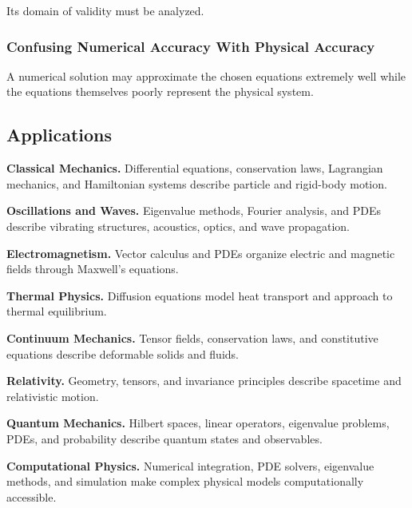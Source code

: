 Its domain of validity must be analyzed.

\subsubsection{Confusing Numerical Accuracy With Physical Accuracy}

A numerical solution may approximate the chosen equations extremely well
while the equations themselves poorly represent the physical system.

\subsection{Applications}
\label{subsec:mathematical-physics-applications}

\begin{applicationbox}

\textbf{Classical Mechanics.}
Differential equations, conservation laws, Lagrangian mechanics, and
Hamiltonian systems describe particle and rigid-body motion.

\medskip

\textbf{Oscillations and Waves.}
Eigenvalue methods, Fourier analysis, and PDEs describe vibrating
structures, acoustics, optics, and wave propagation.

\medskip

\textbf{Electromagnetism.}
Vector calculus and PDEs organize electric and magnetic fields through
Maxwell's equations.

\medskip

\textbf{Thermal Physics.}
Diffusion equations model heat transport and approach to thermal
equilibrium.

\medskip

\textbf{Continuum Mechanics.}
Tensor fields, conservation laws, and constitutive equations describe
deformable solids and fluids.

\medskip

\textbf{Relativity.}
Geometry, tensors, and invariance principles describe spacetime and
relativistic motion.

\medskip

\textbf{Quantum Mechanics.}
Hilbert spaces, linear operators, eigenvalue problems, PDEs, and probability
describe quantum states and observables.

\medskip

\textbf{Computational Physics.}
Numerical integration, PDE solvers, eigenvalue methods, and simulation make
complex physical models computationally accessible.

\end{applicationbox}

